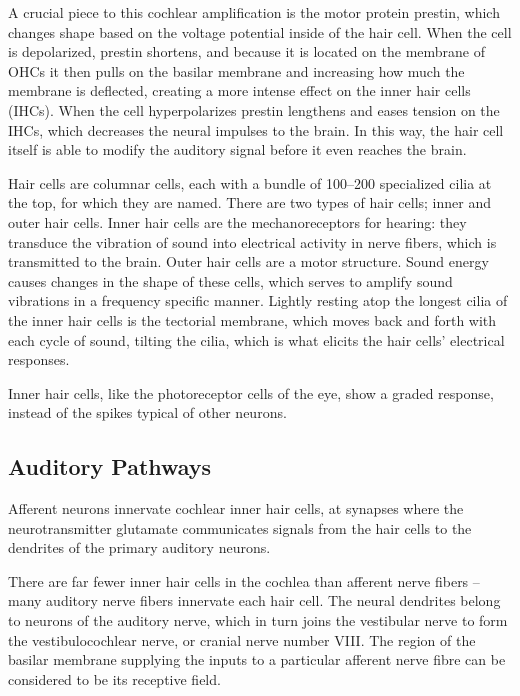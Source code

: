 \documentclass[]{book}
\begin{document}
A crucial piece to this cochlear amplification is the motor protein prestin, which changes shape based on the voltage potential inside of the hair cell. When the cell is depolarized, prestin shortens, and because it is located on the membrane of OHCs it then pulls on the basilar membrane and increasing how much the membrane is deflected, creating a more intense effect on the inner hair cells (IHCs). When the cell hyperpolarizes prestin lengthens and eases tension on the IHCs, which decreases the neural impulses to the brain. In this way, the hair cell itself is able to modify the auditory signal before it even reaches the brain.

Hair cells are columnar cells, each with a bundle of 100--200 specialized cilia at the top, for which they are named. There are two types of hair cells; inner and outer hair cells. Inner hair cells are the mechanoreceptors for hearing: they transduce the vibration of sound into electrical activity in nerve fibers, which is transmitted to the brain. Outer hair cells are a motor structure. Sound energy causes changes in the shape of these cells, which serves to amplify sound vibrations in a frequency specific manner. Lightly resting atop the longest cilia of the inner hair cells is the tectorial membrane, which moves back and forth with each cycle of sound, tilting the cilia, which is what elicits the hair cells' electrical responses.

Inner hair cells, like the photoreceptor cells of the eye, show a graded response, instead of the spikes typical of other neurons.

\hypertarget{auditory-pathways}{%
\subsection{Auditory Pathways}\label{auditory-pathways}}

Afferent neurons innervate cochlear inner hair cells, at synapses where the neurotransmitter glutamate communicates signals from the hair cells to the dendrites of the primary auditory neurons.

There are far fewer inner hair cells in the cochlea than afferent nerve fibers -- many auditory nerve fibers innervate each hair cell. The neural dendrites belong to neurons of the auditory nerve, which in turn joins the vestibular nerve to form the vestibulocochlear nerve, or cranial nerve number VIII. The region of the basilar membrane supplying the inputs to a particular afferent nerve fibre can be considered to be its receptive field.
\end{document}
